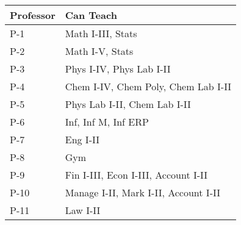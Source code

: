 \begin{tabular}{ll}
  Professor & Can Teach \\\hline\hline
  P-1       & Math I-III, Stats \\
  P-2       & Math I-V, Stats   \\\hline
  P-3       & Phys I-IV, Phys Lab I-II \\
  P-4       & Chem I-IV, Chem Poly, Chem Lab I-II \\
  P-5       & Phys Lab I-II, Chem Lab I-II \\\hline
  P-6       & Inf, Inf M, Inf ERP \\
  P-7       & Eng I-II \\
  P-8       & Gym \\\hline
  P-9       & Fin I-III, Econ I-III, Account I-II \\
  P-10      & Manage I-II, Mark I-II, Account I-II \\
  P-11      & Law I-II \\\hline
\end{tabular}
